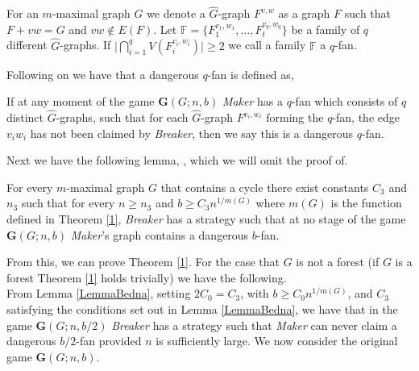 \documentclass[a4paper,oneside,11pt]{report}
\begin{document}
\begin{definition}[$q$-fan]

For an $m$-maximal graph $G$ we denote a $\hat{G}$-graph $F^{v,w}$ as a graph $F$ such that $F + vw = G$ and $vw \notin E(F)$. Let $\mathbb{F} = \{F_1^{v_1,w_1}, \ldots , F_t^{v_q,w_q} \}$ be a family of $q$ different $\hat{G}$-graphs. If $\lvert \bigcap_{i=1}^q V(F_i^{v_i,w_i}) \rvert \geqslant 2$ we call a family $\mathbb{F}$ a $q$-fan. 

\end{definition}

Following on we have that a dangerous $q$-fan is defined as,

\begin{definition}
    If at any moment of the game  $\textbf{G}(G;n,b)$ \textit{Maker} has a $q$-fan which consists of $q$ distinct $\hat{G}$-graphs, such that for each  $\hat{G}$-graph $F^{v_i,w_i}$ forming the $q$-fan, the edge $v_iw_i$ has not been claimed by \textit{Breaker}, then we say this is a dangerous $q$-fan.
\end{definition}

Next we have the following lemma, \cite[Lemma~9]{bednarska2000biased}, which we will omit the proof of.

\begin{lemma}\label{LemmaBedna}

For every $m$-maximal graph $G$ that contains a cycle there exist constants $C_3$ and $n_3$ such that for every $n \geqslant n_3$ and $b \geqslant C_3n^{1/m(G)}$ where $m(G)$ is the function defined in Theorem \ref{1}, \textit{Breaker} has a strategy such that at no stage of the game $\textbf{G}(G;n,b)$ \textit{Maker}'s graph contains a dangerous $b$-fan.

\end{lemma}

From this, we can prove Theorem \ref{1}. For the case that $G$ is not a forest (if $G$ is a forest Theorem \ref{1} holds trivially) we have the following.\\

From Lemma \ref{LemmaBedna}, setting $2C_0 = C_3$, with $b \geqslant C_0n^{1/m(G)}$, and $C_3$ satisfying the conditions set out in Lemma \ref{LemmaBedna}, we have that in the game $\textbf{G}(G;n,b/2)$ \textit{Breaker} has a strategy such that \textit{Maker} can never claim a dangerous $b/2$-fan provided $n$ is sufficiently large. We now consider the original game $\textbf{G}(G;n,b)$.\\
\end{document}
